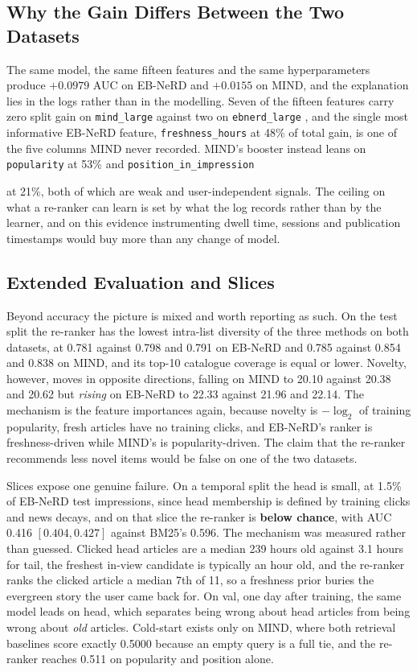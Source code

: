 \documentclass[11pt]{article}
\newcommand{\code}[1]{%
    \colorbox{gray!40}{\texttt{#1}}%
}
\begin{document}
\subsection{Why the Gain Differs Between the Two Datasets}
\label{sec:dataset-gap}

The same model, the same fifteen features and the same hyperparameters produce
$+0.0979$ AUC on EB-NeRD and $+0.0155$ on MIND, and the explanation lies in
the logs rather than in the modelling. Seven of the fifteen features carry
zero split gain on \code{mind\_large} against two on \code{ebnerd\_large}, and
the single most informative EB-NeRD feature, \code{freshness\_hours} at 48\%
of total gain, is one of the five columns MIND never recorded. MIND's booster
instead leans on \code{popularity} at 53\% and \code{position\_in\_impression}
at 21\%, both of which are weak and user-independent signals. The ceiling on
what a re-ranker can learn is set by what the log records rather than by the
learner, and on this evidence instrumenting dwell time, sessions and
publication timestamps would buy more than any change of model.

\subsection{Extended Evaluation and Slices}
\label{sec:ablation}

Beyond accuracy the picture is mixed and worth reporting as such. On the test
split the re-ranker has the lowest intra-list diversity of the three methods
on both datasets, at 0.781 against 0.798 and 0.791 on EB-NeRD and 0.785
against 0.854 and 0.838 on MIND, and its top-10 catalogue coverage is equal or
lower. Novelty, however, moves in opposite directions, falling on MIND to
20.10 against 20.38 and 20.62 but \emph{rising} on EB-NeRD to 22.33 against
21.96 and 22.14. The mechanism is the feature importances again, because
novelty is $-\log_2$ of training popularity, fresh articles have no training
clicks, and EB-NeRD's ranker is freshness-driven while MIND's is
popularity-driven. The claim that the re-ranker recommends less novel items
would be false on one of the two datasets.

Slices expose one genuine failure. On a temporal split the head is small, at
1.5\% of EB-NeRD test impressions, since head membership is defined by
training clicks and news decays, and on that slice the re-ranker is
\textbf{below chance}, with AUC 0.416 $[0.404, 0.427]$ against BM25's 0.596.
The mechanism was measured rather than guessed. Clicked head articles are a
median 239 hours old against 3.1 hours for tail, the freshest in-view
candidate is typically an hour old, and the re-ranker ranks the clicked
article a median 7th of 11, so a freshness prior buries the evergreen story
the user came back for. On val, one day after training, the same model leads
on head, which separates being wrong about head articles from being wrong
about \emph{old} articles. Cold-start exists only on MIND, where both
retrieval baselines score exactly 0.5000 because an empty query is a full tie,
and the re-ranker reaches 0.511 on popularity and position alone.
\end{document}
